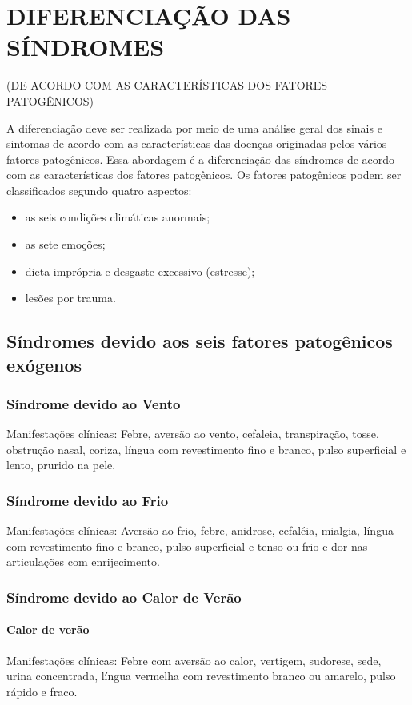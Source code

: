 \documentclass[12pt,oneside,a4paper]{book} %
\begin{document}
\chapter{DIFERENCIAÇÃO DAS SÍNDROMES}(DE ACORDO COM AS CARACTERÍSTICAS DOS FATORES PATOGÊNICOS)

A diferenciação deve ser realizada por meio de uma análise geral dos sinais e sintomas de acordo com as características das doenças originadas pelos vários fatores patogênicos. Essa abordagem é a diferenciação das síndromes de acordo com as características dos fatores patogênicos. Os fatores patogênicos podem ser classificados segundo quatro aspectos: 

\begin{itemize}
\item as seis condições climáticas anormais; 
\item as sete emoções; 
\item dieta imprópria e desgaste excessivo (estresse); 
\item lesões por trauma.
\end{itemize}

\section{Síndromes devido aos seis fatores patogênicos exógenos}

\subsection{Síndrome devido ao Vento} 
Manifestações clínicas: Febre, aversão ao vento, cefaleia, transpiração, tosse, obstrução nasal, coriza, língua com revestimento fino e branco, pulso superficial e lento, prurido na pele.

\subsection{Síndrome devido ao Frio} 
Manifestações clínicas: Aversão ao frio, febre, anidrose, cefaléia, mialgia, língua com revestimento fino e branco, pulso superficial e tenso ou frio e dor nas articulações com enrijecimento.

\subsection{Síndrome devido ao Calor de Verão} 

\subsubsection{Calor de verão}
Manifestações clínicas: Febre com aversão ao calor, vertigem, sudorese, sede, urina concentrada, língua vermelha com revestimento branco ou amarelo, pulso rápido e fraco.
\end{document}
